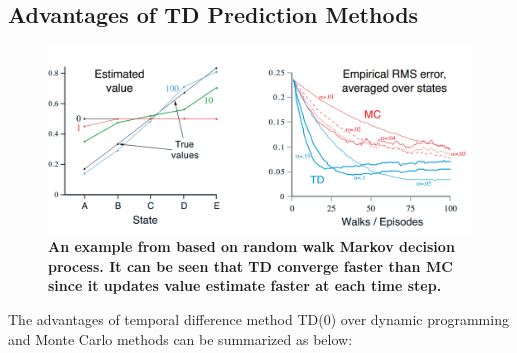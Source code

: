 \documentclass[11pt]{article}
\begin{document}
\subsection{Advantages of TD Prediction Methods}
\begin{figure}
\begin{minipage}[t]{1\linewidth}
  \centering
  \centerline{\includegraphics[scale = 0.3]{td_mc_example.png}}
\end{minipage}
\caption{\footnotesize{\textbf{An example from \citep{sutton2018reinforcement} based on random walk Markov decision process. It can be seen that TD converge faster than MC since it updates value estimate faster at each time step.}}}
\label{fig: td_mc_example}
\end{figure}
The advantages of temporal difference method TD(0) over dynamic programming and Monte Carlo methods can be summarized as below:
\end{document}
